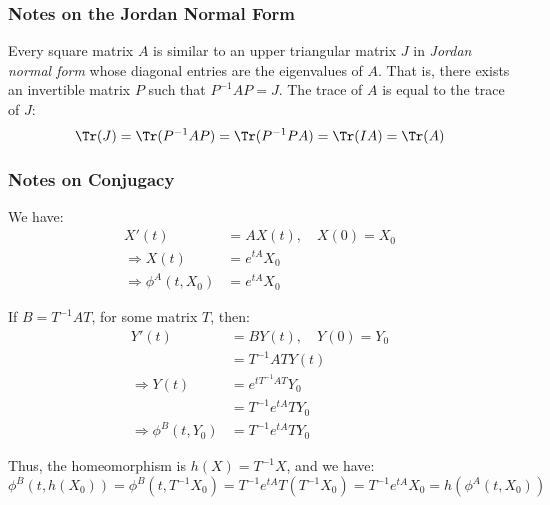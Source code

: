 \documentclass[crop=false,class=article,oneside]{standalone}
\begin{document}
        \subsubsection{Notes on the Jordan Normal Form}
            Every square matrix $A$ is similar to an upper
            triangular matrix $J$ in
            \textit{Jordan normal form} whose diagonal entries
            are the eigenvalues of $A$. That is, there exists
            an invertible matrix $P$ such that $P^{-1}AP=J$.
            The trace of $A$ is equal to the trace of $J$:
            \begin{equation*}
                \Tr(J)
                =\Tr(P^{-1}AP)
                =\Tr(P^{-1}PA)
                =\Tr(IA)=\Tr(A)
            \end{equation*}
        \subsubsection{Notes on Conjugacy}
            \begin{minipage}[t]{0.49\textwidth}
                We have:
                \begin{align*}
                    X'(t)&=AX(t),\quad
                    X(0)=X_{0}\\
                    \Rightarrow
                    X(t)&=e^{tA}X_{0}\\
                    \Rightarrow
                    \phi^{A}(t,X_{0})
                    &=e^{tA}X_{0}
                \end{align*}
            \end{minipage}
            \vline
            \hfill
            \begin{minipage}[t]{0.49\textwidth}
                If $B=T^{-1}AT$, for some matrix $T$, then:
                \begin{align*}
                    Y'(t)&=BY(t),\quad
                    Y(0)=Y_{0}\\
                    &=T^{-1}ATY(t)\\
                    \Rightarrow
                    Y(t)
                    &=e^{tT^{-1}AT}Y_{0}\\
                    &=T^{-1}e^{tA}TY_{0}\\
                    \Rightarrow
                    \phi^{B}(t,Y_{0})
                    &=T^{-1}e^{tA}TY_{0}
                \end{align*}
            \end{minipage}
            Thus, the homeomorphism is $h(X)=T^{-1}X$,
            and we have:
            \begin{equation*}
                \phi^{B}(t,h(X_{0}))
                =\phi^{B}(t,T^{-1}X_{0})
                =T^{-1}e^{tA}T(T^{-1}X_{0})
                =T^{-1}e^{tA}X_{0}
                =h(\phi^{A}(t,X_{0}))
            \end{equation*}
\end{document}
